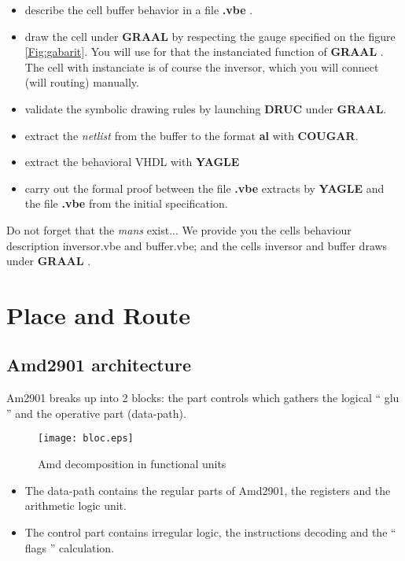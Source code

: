 \documentclass[12pt]{article}
\begin{document}
\begin{itemize}\itemsep=-.4ex
\item   describe the cell buffer behavior in a file { \bf .vbe }.
\item   draw the cell under {\bf GRAAL} by respecting the
        gauge specified on the figure \ref{Fig:gabarit}.
        You will use for that the instanciated function of { \bf GRAAL }.
        The cell with instanciate is of course the inversor, which you will connect (will routing) manually.
\item   validate the symbolic drawing rules by launching {\bf DRUC} under {\bf GRAAL}.
\item   extract the { \it netlist } \/from the buffer to the format {\bf al} with {\bf COUGAR}.
\item   extract the behavioral VHDL with { \bf YAGLE }
\item   carry out the formal proof between the file { \bf .vbe } extracts by { \bf YAGLE }
        and the file { \bf .vbe } from the initial specification.
\end{itemize}

Do not forget that the { \it mans } exist...
We provide you the cells behaviour description inversor.vbe and buffer.vbe;
and the cells inversor and buffer draws under { \bf GRAAL }.


\section{Place and Route}

\subsection{Amd2901 architecture}

Am2901 breaks up into 2 blocks: the part controls which gathers
the logical `` glu '' and the operative part (data-path).

\begin{figure}[H]\centering
  \texttt{[image: bloc.eps]}
  \caption{Amd decomposition in functional units}
  \label{Fig:decomposition}
\end{figure}


\begin{itemize}\itemsep=-.4ex
\item The data-path contains the regular parts of Amd2901, the registers
     and the arithmetic logic unit.
\item The control part contains irregular logic, 
    the instructions decoding and the `` flags '' calculation.
\end{itemize}
\end{document}

